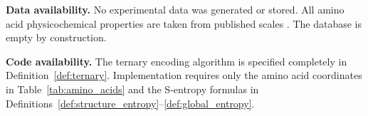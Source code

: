 \documentclass[11pt,twocolumn,a4paper]{article}
\theoremstyle{definition}
\theoremstyle{remark}
\begin{document}
\bigskip

\noindent\textbf{Data availability.} No experimental data was generated or stored. All amino acid physicochemical properties are taken from published scales \citep{kyte1982, creighton1993}. The database is empty by construction.

\bigskip

\noindent\textbf{Code availability.} The ternary encoding algorithm is specified completely in Definition~\ref{def:ternary}. Implementation requires only the amino acid coordinates in Table~\ref{tab:amino_acids} and the S-entropy formulas in Definitions~\ref{def:structure_entropy}--\ref{def:global_entropy}.



\end{document}
